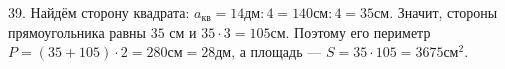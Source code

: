 39. Найдём сторону квадрата: $a_{\text{кв}}=14\text{дм}:4=140\text{см}:4=35$см. Значит, стороны прямоугольника равны $35$ см и $35\cdot3=105$см. Поэтому его периметр $P=(35+105)\cdot2=280\text{см}=28$дм, а площадь --- $S=35\cdot105=3675\text{см}^2.$\\

